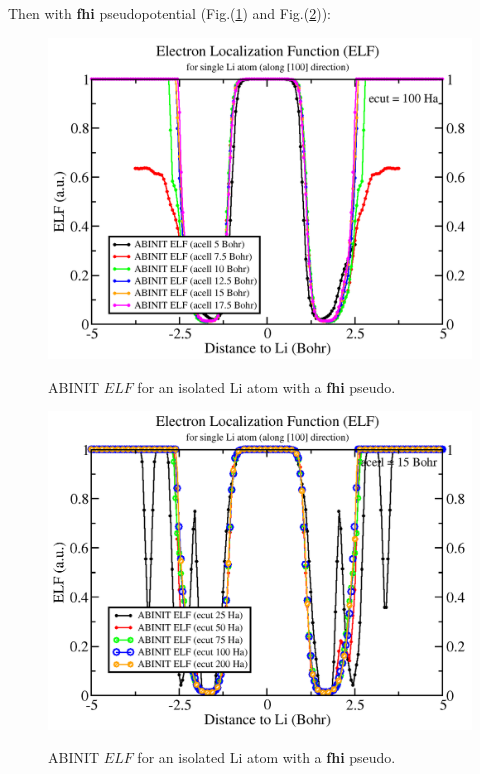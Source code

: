 \documentclass[a4paper,12pt]{report}
\begin{document}
Then with \textbf{fhi} pseudopotential (Fig.(\ref{fig5}) and Fig.(\ref{fig6})):

\begin{figure}[!h]
\centering
\begin{minipage}[c]{1.0\textwidth}
\includegraphics[width = \textwidth]{fig5}
\end{minipage}
\vspace{0.12\textwidth}
\begin{minipage}[c]{0.8\textwidth}
\caption{\small ABINIT $ELF$ for an isolated Li atom with a \textbf{fhi} pseudo.}
\vspace*{1.0ex}
\label{fig5}
\end{minipage}
\end{figure}

\begin{figure}[!h]
\centering
\begin{minipage}[c]{1.0\textwidth}
\includegraphics[width = \textwidth]{fig6}
\end{minipage}
\vspace{0.12\textwidth}
\begin{minipage}[c]{0.8\textwidth}
\caption{\small ABINIT $ELF$ for an isolated Li atom with a \textbf{fhi} pseudo.}
\vspace*{1.0ex}
\label{fig6}
\end{minipage}
\end{figure}
\end{document}
